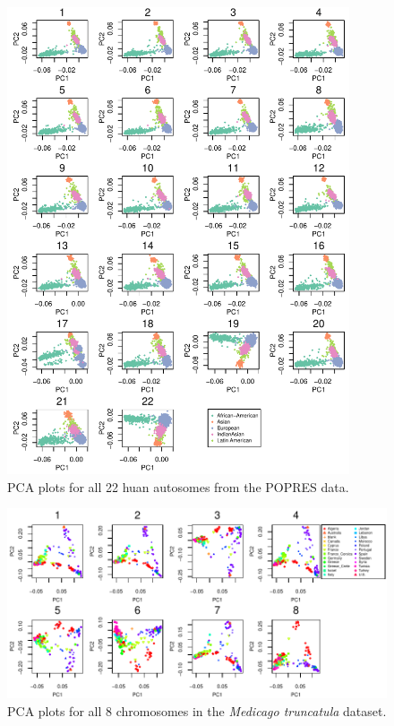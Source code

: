 \documentclass[11pt, oneside]{article}   	%
\begin{document}
\begin{figure}
    \begin{center}
       \includegraphics[width=0.9\textwidth]{FigS_pca_plot_allchr_human}
    \end{center}
    \caption{
        PCA plots for all 22 huan autosomes from the POPRES data.
        \label{fig:pca_human_allchr}
    }
\end{figure}

\begin{figure}
    \begin{center}
       \includegraphics[width=1\textwidth]{FigS_pca_plots_medicago_allchr}
    \end{center}
    \caption{
        PCA plots for all 8 chromosomes in the \textit{Medicago truncatula} dataset.
        \label{fig:pca_medicago_allchr}
    }
\end{figure}
\end{document}
